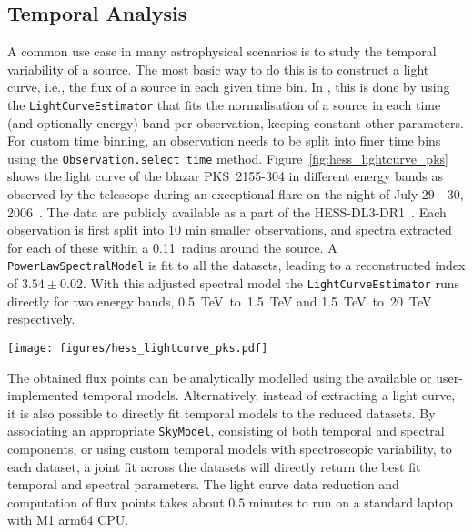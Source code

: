 \documentclass[longauth]{aa}
\newcommand{\code}[1]{\texttt{#1}}
\begin{document}
\subsection{Temporal Analysis}
\label{ssec:temporal-analysis}
A common use case in many astrophysical scenarios is to study the temporal
variability of a source. The most basic way to do this is to construct a
light curve, i.e., the flux of a source in each given time bin. In \gammapy, this
is done by using the \code{LightCurveEstimator} that fits the normalisation of a
source in each time (and optionally energy) band per observation, keeping constant
other parameters.
For custom time binning, an observation needs to be split into finer time bins using
the \code{Observation.select\_time} method. Figure~\ref{fig:hess_lightcurve_pks}
shows the light curve of the blazar PKS~2155-304 in different energy bands as
observed by the \hess telescope during an exceptional flare on the night of
July 29 - 30, 2006~\cite{2009A&A...502..749A}. The data are publicly available 
as a part of the HESS-DL3-DR1~\cite{HESS_DR1}. Each observation is first split into 10 min smaller
observations, and spectra extracted for each of these within a 0.11\textdegree~radius
around the source. A \code{PowerLawSpectralModel} is fit to all the datasets, leading
to a reconstructed index of $3.54 \pm 0.02$. With this adjusted spectral model
the \code{LightCurveEstimator} runs directly for two energy bands,
\SI{0.5}{TeV}~to~\SI{1.5}{TeV} and \SI{1.5}{TeV}~to~\SI{20}{TeV} respectively.
%
\begin{figure*}[t]
    \sidecaption
	\texttt{[image: figures/hess\_lightcurve\_pks.pdf]}
	\caption{
        Binned PKS~2155-304 light curve in two different energy bands
        as observed by the \hess telescopes in 2006. The coloured markers
        show the flux points in the different energy bands:
		the range from (\SI{0.5}{TeV}~to~\SI{1.5}{TeV} is shown in blue, while
		the range from \SI{1.5}{TeV}~to~\SI{20}{TeV}) is shown in orange.
		The horizontal error illustrates the width of the time bin of 10~min. The vertical
        error bars show the associated asymmetrical flux errors. The marker
        is set to the center of the time bin.
    }
    \label{fig:hess_lightcurve_pks}
\end{figure*}
%
The obtained flux points can be analytically modelled using the available or
user-implemented temporal models. Alternatively, instead of  extracting a
light curve, it is also possible to directly fit temporal models to the reduced
datasets. By associating an appropriate \code{SkyModel}, consisting of both temporal
and spectral components, or using custom temporal models with spectroscopic
variability, to each dataset, a joint fit across the datasets will directly
return the best fit temporal and spectral parameters. The light curve data reduction
and computation of flux points takes about $0.5$ minutes to run on a standard laptop with M1 arm64 CPU.
\end{document}
